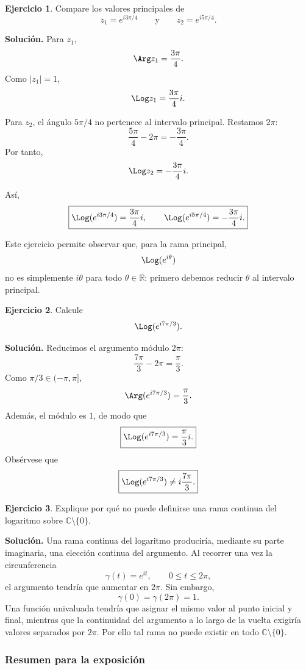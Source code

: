\documentclass[12pt]{article}
\theoremstyle{definition}
\newtheorem{ejercicio}{Ejercicio}[section]
\theoremstyle{remark}
\begin{document}
\begin{ejercicio}
Compare los valores principales de
\[
z_1=e^{i3\pi/4}
\qquad\text{y}\qquad
z_2=e^{i5\pi/4}.
\]
\end{ejercicio}

\textbf{Solución.}
Para $z_1$,
\[
\Arg z_1=\frac{3\pi}{4}.
\]
Como $|z_1|=1$,
\[
\Log z_1=\frac{3\pi}{4}i.
\]

Para $z_2$, el ángulo $5\pi/4$ no pertenece al intervalo principal. Restamos
$2\pi$:
\[
\frac{5\pi}{4}-2\pi=-\frac{3\pi}{4}.
\]
Por tanto,
\[
\Log z_2=-\frac{3\pi}{4}i.
\]

Así,
\[
\boxed{
\Log(e^{i3\pi/4})=\frac{3\pi}{4}i,
\qquad
\Log(e^{i5\pi/4})=-\frac{3\pi}{4}i.
}
\]

Este ejercicio permite observar que, para la rama principal,
\[
\Log(e^{i\theta})
\]
no es simplemente $i\theta$ para todo $\theta\in\mathbb R$: primero debemos
reducir $\theta$ al intervalo principal.

\begin{ejercicio}
Calcule
\[
\Log(e^{i7\pi/3}).
\]
\end{ejercicio}

\textbf{Solución.}
Reducimos el argumento módulo $2\pi$:
\[
\frac{7\pi}{3}-2\pi
=
\frac{\pi}{3}.
\]
Como $\pi/3\in(-\pi,\pi]$,
\[
\Arg(e^{i7\pi/3})=\frac{\pi}{3}.
\]
Además, el módulo es $1$, de modo que
\[
\boxed{
\Log(e^{i7\pi/3})=\frac{\pi}{3}i.
}
\]
Obsérvese que
\[
\boxed{
\Log(e^{i7\pi/3})\neq i\frac{7\pi}{3}.
}
\]

\begin{ejercicio}
Explique por qué no puede definirse una rama continua del logaritmo sobre
$\mathbb C\setminus\{0\}$.
\end{ejercicio}

\textbf{Solución.}
Una rama continua del logaritmo produciría, mediante su parte imaginaria, una
elección continua del argumento. Al recorrer una vez la circunferencia
\[
\gamma(t)=e^{it},\qquad0\leq t\leq2\pi,
\]
el argumento tendría que aumentar en $2\pi$. Sin embargo,
\[
\gamma(0)=\gamma(2\pi)=1.
\]
Una función univaluada tendría que asignar el mismo valor al punto inicial y
final, mientras que la continuidad del argumento a lo largo de la vuelta
exigiría valores separados por $2\pi$. Por ello tal rama no puede existir en
todo $\mathbb C\setminus\{0\}$.

\subsubsection{Resumen para la exposición}
\end{document}
